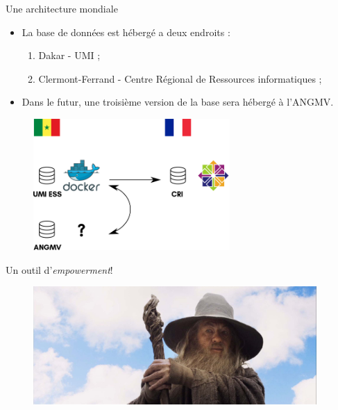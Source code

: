 \documentclass[newPxFont]{beamer}
\begin{document}
\begin{frame}[c]{Une architecture mondiale}
\vspace{-1cm}
\begin{itemize}
	\item La base de données est hébergé a deux endroits :
	\begin{enumerate}
		\item Dakar - UMI ;
		\item Clermont-Ferrand - Centre Régional de Ressources informatiques ;
	\end{enumerate}
	\item Dans le futur, une troisième version de la base sera hébergé à l'ANGMV.
\end{itemize}
\begin{figure}
	\centering
	\includegraphics[height=5cm]{img/sch_database}
\end{figure}
\end{frame}

\begin{frame}[c]{Un outil d'\textit{empowerment}!}
\vspace{-2em}
\begin{figure}
	\centering
	\includegraphics[height = 4.5cm]{img/gandalf}
\end{figure}
\end{frame}
\end{document}
